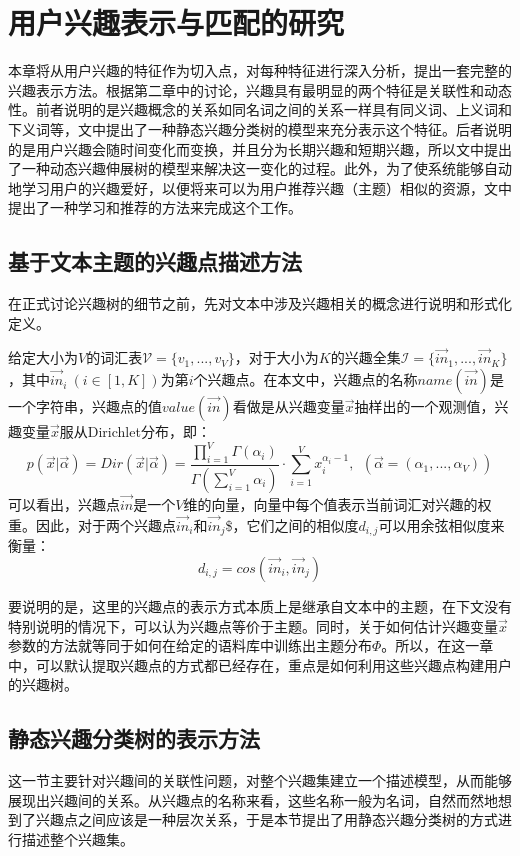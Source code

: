 \section{用户兴趣表示与匹配的研究}
本章将从用户兴趣的特征作为切入点，对每种特征进行深入分析，提出一套完整的兴趣表示方法。根据第二章中的讨论，兴趣具有最明显的两个特征是关联性和动态性。前者说明的是兴趣概念的关系如同名词之间的关系一样具有同义词、上义词和下义词等，文中提出了一种静态兴趣分类树的模型来充分表示这个特征。后者说明的是用户兴趣会随时间变化而变换，并且分为长期兴趣和短期兴趣，所以文中提出了一种动态兴趣伸展树的模型来解决这一变化的过程。此外，为了使系统能够自动地学习用户的兴趣爱好，以便将来可以为用户推荐兴趣（主题）相似的资源，文中提出了一种学习和推荐的方法来完成这个工作。

\subsection{基于文本主题的兴趣点描述方法}
在正式讨论兴趣树的细节之前，先对文本中涉及兴趣相关的概念进行说明和形式化定义。

给定大小为$V$的词汇表$\mathcal{V}=\{v_1,...,v_V\}$，对于大小为$K$的兴趣全集$\mathcal{I}=\{\vec{in}_1,...,\vec{in}_K\}$，其中$\vec{in}_i~(i\in [1,K])$为第$i$个兴趣点。在本文中，兴趣点的名称$name(\vec{in})$是一个字符串，兴趣点的值$value(\vec{in})$看做是从兴趣变量$\vec{x}$抽样出的一个观测值，兴趣变量$\vec{x}$服从Dirichlet分布，即：
\begin{equation*}
  p(\vec{x}|\vec{\alpha})=Dir(\vec{x}|\vec{\alpha})=\frac{\prod_{i=1}^{V}\Gamma(\alpha_i)}{\Gamma(\sum_{i=1}^{V}\alpha_i)}\cdot \sum_{i=1}^{V}x_i^{\alpha_i-1},~~(\vec{\alpha}=(\alpha_1,...,\alpha_V))
\end{equation*}
可以看出，兴趣点$\vec{in}$是一个$V$维的向量，向量中每个值表示当前词汇对兴趣的权重。因此，对于两个兴趣点$\vec{in}_i$和$\vec{in}_j$\$，它们之间的相似度$d_{i,j}$可以用余弦相似度来衡量：
\begin{equation}
  \label{eq:intsim}
  d_{i,j}=cos(\vec{in}_i,\vec{in}_j)
\end{equation}

要说明的是，这里的兴趣点的表示方式本质上是继承自文本中的主题，在下文没有特别说明的情况下，可以认为兴趣点等价于主题。同时，关于如何估计兴趣变量$\vec{x}$参数的方法就等同于如何在给定的语料库中训练出主题分布$\Phi$。所以，在这一章中，可以默认提取兴趣点的方式都已经存在，重点是如何利用这些兴趣点构建用户的兴趣树。

\subsection{静态兴趣分类树的表示方法}
这一节主要针对兴趣间的关联性问题，对整个兴趣集建立一个描述模型，从而能够展现出兴趣间的关系。从兴趣点的名称来看，这些名称一般为名词，自然而然地想到了兴趣点之间应该是一种层次关系，于是本节提出了用静态兴趣分类树的方式进行描述整个兴趣集。

